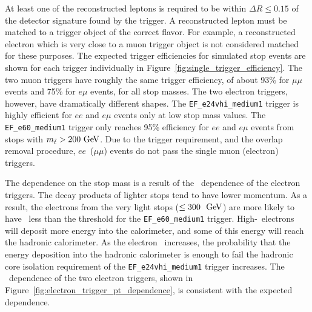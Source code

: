 \begin{table}[ht]
    \caption{Requirements for the triggers used in this analysis.  }
    \label{tab:trigger_defs}
\end{table}

At least one of the reconstructed leptons is required to be within 
$\Delta R \leq 0.15$ of the detector signature found by the trigger.
A reconstructed lepton must be matched to a trigger object of the correct flavor.
For example, a reconstructed electron which is very close to a muon trigger
object is not considered matched for these purposes.
The expected trigger efficiencies for simulated stop events are shown
for each trigger individually in Figure~\ref{fig:single_trigger_efficiency}.
The two muon triggers have roughly the same trigger efficiency, of about 93\% 
for $\mu\mu$ events and 75\% for $e\mu$ events, for all stop masses.
The two electron triggers, however, have dramatically different shapes.
The \texttt{EF\_e24vhi\_medium1} trigger is highly efficient for $ee$ and
$e\mu$ events only at low stop mass values.
The \texttt{EF\_e60\_medium1} trigger only reaches 95\% efficiency for
$ee$ and $e\mu$ events from stops with $m_{\tilde{t}} > 200 \GeV$.
Due to the trigger requirement, and the overlap removal procedure,
$ee$~($\mu\mu$) events do not pass the single muon (electron) triggers.

The dependence on the stop mass is a result of the \ET\ dependence of the
electron triggers.
The decay products of lighter stops tend to have lower momentum.
As a result, the electrons from the very light stops ($\leq 300~\GeV$) 
are more likely to have \ET\ less than the threshold for the
\texttt{EF\_e60\_medium1} trigger.
High-\ET\ electrons will deposit more energy into the calorimeter,
and some of this energy will reach the hadronic calorimeter.
As the electron \ET\ increases, the probability that the energy deposition into
the hadronic calorimeter is enough to fail the hadronic core isolation
requirement of the \texttt{EF\_e24vhi\_medium1} trigger increases.
The \ET\ dependence of the two electron triggers, shown in
Figure~\ref{fig:electron_trigger_pt_dependence}, is consistent with the expected
dependence.

